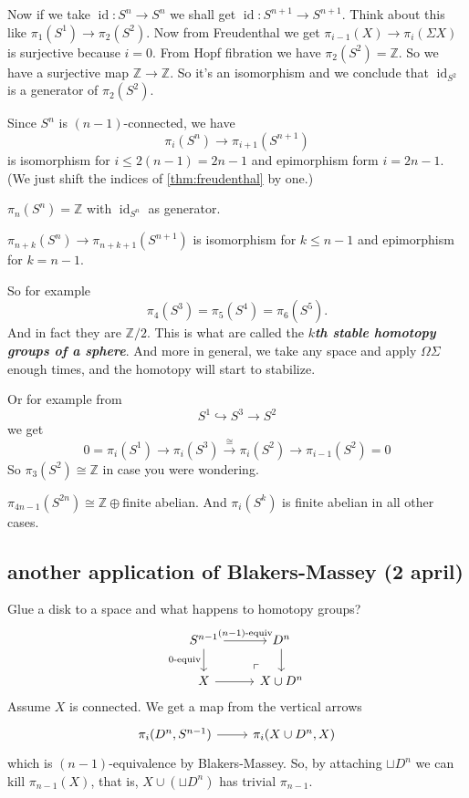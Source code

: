\documentclass{article}
\newcommand{\Z}{\mathbb{Z}}
\DeclareMathOperator{\id}{id}
\begin{document}
Now if we take $\id:S^n\to S^n$ we shall get $\id:S^{n+1}\to S^{n+1}$. Think about this like $\pi_1(S^1)\to\pi_2(S^2)$. Now from Freudenthal we get $\pi_{i-1}(X)\to\pi_i(\Sigma X)$ is surjective because $i=0$. From Hopf fibration we have $\pi_2(S^2)=\Z$. So we have a surjective map $\Z\to\Z$. So it's an isomorphism and we conclude that $\id_{S^2}$ is a generator of $\pi_2(S^2)$.

\begin{coro}
	Since $S^n$ is $(n-1)$-connected, we have
	\[\pi_i(S^n)\to\pi_{i+1}(S^{n+1})\]
	is isomorphism for $i\leq 2(n-1)=2n-1$ and epimorphism form $i=2n-1$. (We just shift the indices of \cref{thm:freudenthal} by one.)
\end{coro}
\begin{coro}
	$\pi_n(S^n)=\Z$ with $\id_{S^n}$ as generator.
\end{coro}
\begin{coro}
	$\pi_{n+k}(S^n)\to\pi_{n+k+1}(S^{n+1})$ is isomorphism for $k\leq n-1$ and epimorphism for $k=n-1$.
\end{coro}
So for example
\[\pi_4(S^3)=\pi_5(S^4)=\pi_6(S^5).\]
And in fact they are $\Z/2$. This is what are called the \textbf{\textit{$k$th stable homotopy groups of a sphere}}. And more in general, we take any space and apply $\Omega\Sigma$ enough times, and the homotopy will start to stabilize.

Or for example from
\[S^1\hookrightarrow S^3\to S^2\]
we get
\[0=\pi_i(S^1)\to \pi_i(S^3)\overset{\cong}{\to}\pi_i(S^2)\to\pi_{i-1}(S^2)=0\]
So $\pi_3(S^2)\cong\Z$ in case you were wondering.
\begin{claim}[Serre]
	$\pi_{4n-1}(S^{2n})\cong\Z\oplus$finite abelian. And $\pi_i(S^k)$ is finite abelian in all other cases.
\end{claim}

\subsection{another application of Blakers-Massey (2 april)}
Glue a disk to a space and what happens to homotopy groups?
\[\begin{tikzcd}
	S^{n-1}\arrow[r,"(n-1)\text{-equiv}"]\arrow[d,"0\text{-equiv}",swap]&D^n\arrow[d]\\
	X\arrow[r]&X\cup D^n\arrow[ul, phantom, "\ulcorner", very near start]
\end{tikzcd}\]
Assume $X$ is connected. We get a map from the vertical arrows
\[\begin{tikzcd}
	\pi_i(D^n,S^{n-1})\arrow[r]&\pi_i(X\cup D^n,X)
\end{tikzcd}\]
which is $(n-1)$-equivalence by Blakers-Massey. So, by attaching $\sqcup D^n$ we can kill $\pi_{n-1}(X)$, that is, $X\cup(\sqcup D^n)$ has trivial $\pi_{n-1}$.
\end{document}
